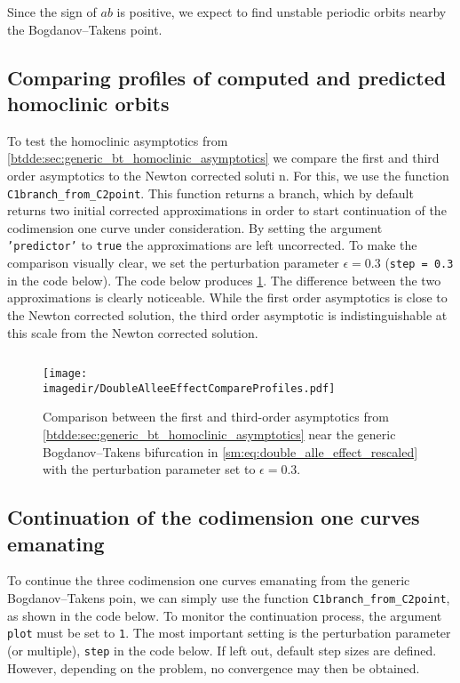 Since the sign of $ab$ is positive, we expect to find unstable periodic orbits nearby the 
Bogdanov--Takens point.

\subsection{Comparing profiles of computed and predicted homoclinic orbits}
To test the homoclinic asymptotics from
\cref{btdde:sec:generic_bt_homoclinic_asymptotics} we compare the first and third
order asymptotics to the Newton corrected soluti n. For this, we use the 
function \texttt{C1branch_from_C2point}. This function returns a branch, which
by default returns two initial corrected approximations in order to start continuation of the
codimension one curve under consideration. By setting the argument
\texttt{'predictor'} to \texttt{true} the approximations are left uncorrected.
To make the comparison visually clear, we set the perturbation parameter 
$\epsilon=0.3$ (\texttt{step = 0.3} in the code below).
The code below produces \cref{sm:fig:DoubleAlleeEffectCompareProfiles}.
The difference between the two approximations is clearly noticeable. While
the first order asymptotics is close to the Newton corrected solution, the third
order asymptotic is indistinguishable at this scale from the Newton corrected
solution.
\inputminted[firstline=62, lastline=80]{MATLAB}{\pathToDDEBifToolDemos/predator_prey/predator_prey.m}
\begin{figure}[ht!]
    \centering
    \texttt{[image: \\imagedir/DoubleAlleeEffectCompareProfiles.pdf]}
    \caption{Comparison between the first and third-order asymptotics from
    \cref{btdde:sec:generic_bt_homoclinic_asymptotics} near the generic
        Bogdanov--Takens bifurcation in \cref{sm:eq:double_alle_effect_rescaled} with the
        perturbation parameter set to $\epsilon=0.3$.}
    \label{sm:fig:DoubleAlleeEffectCompareProfiles}
\end{figure}

\subsection{Continuation of the codimension one curves emanating}
To continue the three codimension one curves emanating from the generic
Bogdanov--Takens poin, we can simply use the function
\texttt{C1branch_from_C2point}, as shown in the code below. To monitor the
continuation process, the argument \texttt{plot} must be set to \texttt{1}.
The most important setting is the perturbation parameter (or multiple),
\texttt{step} in the code below. If left out, default step sizes are defined.
However, depending on the problem, no convergence may then be obtained.
\inputminted[firstline=82, lastline=100]{MATLAB}{\pathToDDEBifToolDemos/predator_prey/predator_prey.m}

